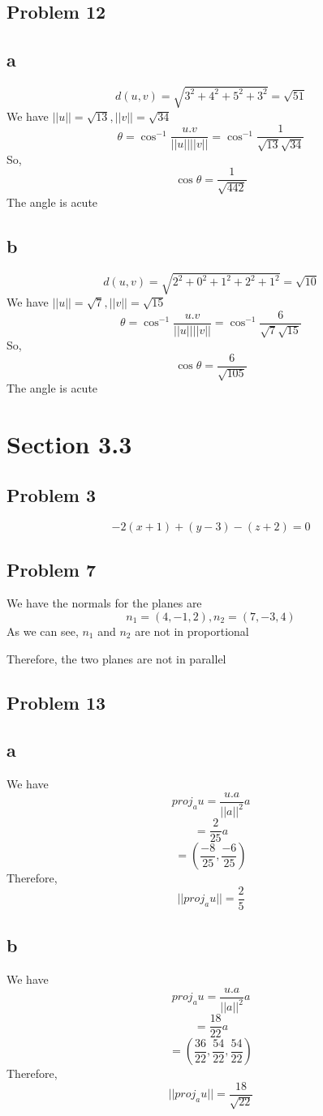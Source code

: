 \documentclass[a4paper,12pt]{report}
\begin{document}
\subsection*{Problem 12}
\subsection*{a}
\[d(u,v)=\sqrt{3^2+4^2+5^2+3^2}=\sqrt{51}\]
We have \(||u||=\sqrt{13},||v||=\sqrt{34}\)
\[\theta=\cos^{-1}{\frac{u.v}{||u||||v||}}=\cos^{-1}{\frac{1}{\sqrt{13}\sqrt{34}}}\]
So,
\[\cos\theta=\frac{1}{\sqrt{442}}\]
The angle is acute

\subsection*{b}
\[d(u,v)=\sqrt{2^2+0^2+1^2+2^2+1^2}=\sqrt{10}\]
We have \(||u||=\sqrt{7},||v||=\sqrt{15}\)
\[\theta=\cos^{-1}{\frac{u.v}{||u||||v||}}=\cos^{-1}{\frac{6}{\sqrt{7}\sqrt{15}}}\]
So,
\[\cos\theta=\frac{6}{\sqrt{105}}\]
The angle is acute

\section*{Section 3.3}
\subsection*{Problem 3}
\[-2(x+1)+(y-3)-(z+2)=0\]

\subsection*{Problem 7}
We have the normals for the planes are 
\[n_1=(4,-1,2),n_2=(7,-3,4)\]
As we can see, \(n_1\) and \(n_2\) are not in proportional

Therefore, the two planes are not in parallel

\subsection*{Problem 13}
\subsection*{a}
We have 
\[proj_au=\frac{u.a}{||a||^2}a\]
\[=\frac{2}{25}a\]
\[=(\frac{-8}{25},\frac{-6}{25})\]
Therefore, 
\[||proj_au||=\frac{2}{5}\]

\subsection*{b}
We have 
\[proj_au=\frac{u.a}{||a||^2}a\]
\[=\frac{18}{22}a\]
\[=(\frac{36}{22},\frac{54}{22},\frac{54}{22})\]
Therefore, 
\[||proj_au||=\frac{18}{\sqrt{22}}\]
\end{document}
